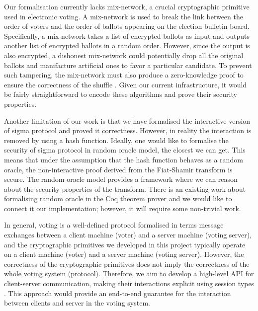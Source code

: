 \documentclass[conference,compsoc]{IEEEtran}
\begin{document}
   Our formalisation currently lacks mix-network, a crucial cryptographic primitive used 
   in electronic voting. A mix-network is used to break the link between the order of 
   voters and the order of ballots appearing on the election bulletin board. 
   Specifically, a mix-network takes a list of encrypted ballots as input and 
   outputs another list of encrypted ballots in a random order.
   However, since the output is also encrypted, a dishonest mix-network could 
   potentially drop all the original ballots and manifacture artificial ones to favor a 
   particular candidate. To prevent such tampering, the mix-network must also 
   produce a zero-knowledge proof to ensure the correctness of the shuffle \cite{10.1007/978-3-642-02620-1_28,10.1007/978-3-030-51280-4_3}.
   Given our current infrastructure, it would be fairly straightforward to 
   encode these algorithms and prove their security properties. 
   

   Another limitation of our work is 
   that we have formalised the interactive version 
   of sigma protocol and proved it correctness. However, 
   in reality the interaction is removed by 
   using a hash function. Ideally, one would like 
   to formalise the security of sigma protocol in random oracle 
   model, the closest we can get. This means that under the assumption 
   that the hash function behaves as a random oracle, the non-interactive 
   proof derived from the Fiat-Shamir transform is secure. 
   The random oracle model provides a framework where we can 
   reason about the security properties  of 
   the transform. There is an existing 
   work about formalising random oracle in the Coq theorem 
   prover \cite{10.1007/11617990_3} and we would like to 
   connect it our implementation; however, it 
   will require some non-trivial work. 
   
   
  In general, voting is a well-defined protocol formalised in terms 
  message exchanges between a client machine (voter) and a server machine (voting server), 
  and the cryptographic primitives we developed in this project typically operate on 
  a client machine (voter) and a server machine (voting server). 
  However, the correctness of the cryptographic primitives does not imply the 
  correctness of the whole voting system (protocol). Therefore, we aim to develop 
  a high-level API for client-server communication, making their interactions explicit 
  using session types \cite{10.1145/3453483.3454041}. 
  This approach would provide an end-to-end guarantee for the interaction 
  between clients and server in the voting system. 
\end{document}
